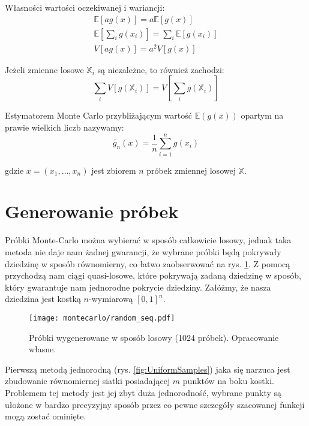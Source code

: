 \documentclass[../main.tex]{subfiles}
\begin{document}
Własności wartości oczekiwanej i wariancji:
\begin{equation}
\begin{gathered}
\mathbb{E}\left[ag(x)\right] = a \mathbb{E} \left[g(x)\right] \\
\mathbb{E}\left[\sum_{i} g(x_i)\right] = \sum_{i} \mathbb{E} \left[g(x_i)\right] \\
V\left[ ag(x) \right] = a^2 V\left[g(x)\right]
\end{gathered}
\end{equation}

Jeżeli zmienne losowe $\mathbb{X}_i$ są niezależne, to również zachodzi:
\begin{equation}
\sum_{i} V \left[
	g(\mathbb{X}_i)
\right]
=
V \left[
	\sum_{i} g(\mathbb{X}_i)
\right]
\end{equation}

Estymatorem Monte Carlo przybliżającym wartość $\mathbb{E}(g(x))$ opartym na prawie wielkich liczb nazywamy:
\begin{equation}
\widetilde{g_n}(x) =
	\frac{1}{n}
	\sum_{i=1}^{n}g(x_i)
\end{equation}

\noindent gdzie $x=(x_1, \ldots, x_n)$ jest zbiorem $n$ próbek zmiennej losowej $\mathbb{X}$.

\section{Generowanie próbek}

Próbki Monte-Carlo można wybierać w sposób całkowicie losowy, jednak taka metoda nie daje nam żadnej gwarancji, że wybrane próbki będą pokrywały dziedzinę w sposób równomierny, co łatwo zaobserwować na rys. \ref{fig:RandomSamples}. Z pomocą przychodzą nam ciągi quasi-losowe, które pokrywają zadaną dziedzinę w sposób, który gwarantuje nam jednorodne pokrycie dziedziny. Załóżmy, że nasza dziedzina jest kostką $n$-wymiarową 
$[0,1]^{n}$.

\begin{figure}[h]
  \centering
  \texttt{[image: montecarlo/random\_seq.pdf]}
  \caption{Próbki wygenerowane w sposób losowy (1024 próbek). Opracowanie własne.}
  \label{fig:RandomSamples}
\end{figure}

Pierwszą metodą jednorodną (rys. \ref{fig:UniformSamples}) jaka się narzuca jest zbudowanie równomiernej siatki posiadającej $m$ punktów na boku kostki. Problemem tej metody jest jej zbyt duża jednorodność, wybrane punkty są ułożone w bardzo precyzyjny sposób przez co pewne szczegóły szacowanej funkcji mogą zostać ominięte.
\end{document}
